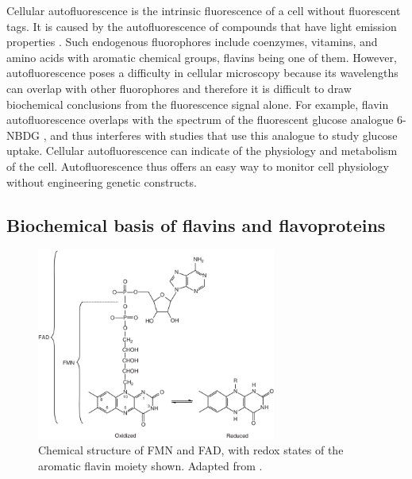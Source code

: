 Cellular autofluorescence is the intrinsic fluorescence of a cell without fluorescent tags.
It is caused by the autofluorescence of compounds that have light emission properties \parencite{maslankaAutofluorescenceYeastSaccharomyces2018}.
Such endogenous fluorophores include coenzymes, vitamins, and amino acids with aromatic chemical groups, flavins being one of them.
However, autofluorescence poses a difficulty in cellular microscopy because its wavelengths can overlap with other fluorophores and therefore it is difficult to draw biochemical conclusions from the fluorescence signal alone.
For example, flavin autofluorescence overlaps with the spectrum of the fluorescent glucose analogue 6-NBDG \parencite{maslankaAutofluorescenceYeastSaccharomyces2018}, and thus interferes with studies that use this analogue to study glucose uptake.
Cellular autofluorescence can indicate of the physiology and metabolism of the cell.
Autofluorescence thus offers an easy way to monitor cell physiology without engineering genetic constructs.

\subsection{Biochemical basis of flavins and flavoproteins}
\label{subsec:intro-flavin-biochem}

\begin{figure}
  \centering
  \includegraphics[width=0.7\textwidth]{patelFlavinContainingOxidativeBiocatalysts2006_1}
  \caption[
    Chemical structure of FMN and FAD
  ]{
    Chemical structure of FMN and FAD, with redox states of the aromatic flavin moiety shown.
    Adapted from \textcite{patelFlavinContainingOxidativeBiocatalysts2006}.}
  \label{fig:intro-flavin-structure}
\end{figure}

